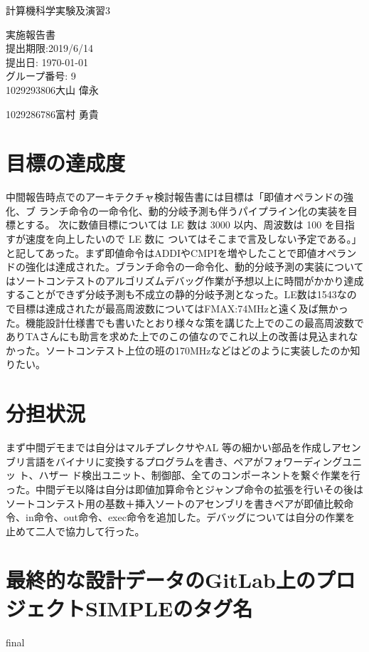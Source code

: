 \documentclass[a4paper,11pt,oneside,openany]{jsarticle}
\begin{document}
\begin{center}

  \vspace*{35mm}
  \huge 計算機科学実験及演習3 \par
  実施報告書 \\
  \vspace{90mm}
  \Large 提出期限:2019/6/14\\
   提出日: \today \\
  \vspace{15mm}
  \Large グループ番号: 9    \\
   1029293806\hspace{5mm}大山 偉永\par
   1029286786\hspace{5mm}富村 勇貴\par

  \vspace{10mm}
\end{center}
\clearpage
\addtocounter{page}{-1}

\newpage

\section{目標の達成度}
中間報告時点でのアーキテクチャ検討報告書には目標は「即値オペランドの強化、ブ ランチ命令の一命令化、動的分岐予測も伴うパイプライン化の実装を目標とする。 次に数値目標については LE 数は 3000 以内、周波数は 100 を目指すが速度を向上したいので LE 数に ついてはそこまで言及しない予定である。」と記してあった。まず即値命令はADDIやCMPIを増やしたことで即値オペランドの強化は達成された。ブランチ命令の一命令化、動的分岐予測の実装についてはソートコンテストのアルゴリズムデバッグ作業が予想以上に時間がかかり達成することができず分岐予測も不成立の静的分岐予測となった。LE数は1543なので目標は達成されたが最高周波数についてはFMAX:74MHzと遠く及ば無かった。機能設計仕様書でも書いたとおり様々な策を講じた上でのこの最高周波数でありTAさんにも助言を求めた上でのこの値なのでこれ以上の改善は見込まれなかった。ソートコンテスト上位の班の170MHzなどはどのように実装したのか知りたい。

\section{分担状況}
まず中間デモまでは自分はマルチプレクサやAL 等の細かい部品を作成しアセンブリ言語をバイナリに変換するプログラムを書き、ペアがフォワーディングユニッ ト、ハザー ド検出ユニット、制御部、全てのコンポーネントを繋ぐ作業を行った。中間デモ以降は自分は即値加算命令とジャンプ命令の拡張を行いその後はソートコンテスト用の基数＋挿入ソートのアセンブリを書きペアが即値比較命令、in命令、out命令、exec命令を追加した。デバッグについては自分の作業を止めて二人で協力して行った。

\section{最終的な設計データのGitLab上のプロジェクトSIMPLEのタグ名}
  final
\end{document}
